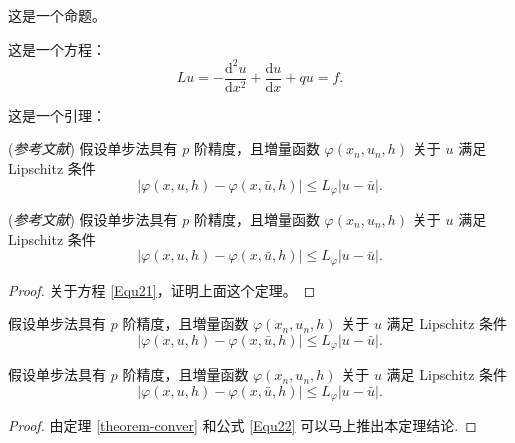 \documentclass{shnuthesis}
\begin{document}
\begin{proposition}[Proposition]
这是一个命题。
\end{proposition}

这是一个方程：
\begin{equation}\label{Equ21}
L u=-\frac{\mathrm{d}^{2} u}{\mathrm{d} x^{2}}+\frac{\mathrm{d} u}{\mathrm{d} x}+q u=f.
\end{equation}

这是一个引理：
\begin{lemma}\label{lemma-conver} {\rm (\textit{参考文献}\cite{Shen1994})}
假设单步法具有 $p$ 阶精度，且増量函数 $\varphi(x_{n}, u_{n}, h)$ 关于 $u$ 满足 Lipschitz 条件
\begin{equation}\label{Equ22}
|\varphi(x, u, h)-\varphi(x, \bar{u}, h)| \leqslant L_{\varphi}|u-\bar{u}|.
\end{equation}
\end{lemma}

\begin{theorem}\label{theorem-conver} {\rm (\textit{参考文献}\cite{Adams1975})}
假设单步法具有 $p$ 阶精度，且増量函数 $\varphi(x_{n}, u_{n}, h)$ 关于 $u$ 满足 Lipschitz 条件
\begin{equation}\label{Equ23}
|\varphi(x, u, h)-\varphi(x, \bar{u}, h)| \leqslant L_{\varphi}|u-\bar{u}|.
\end{equation}
\end{theorem}
\begin{proof}
关于方程 \eqref{Equ21}，证明上面这个定理。
\end{proof}


\begin{theorem}\label{theorem-conver2}
假设单步法具有 $p$ 阶精度，且増量函数 $\varphi(x_{n}, u_{n}, h)$ 关于 $u$ 满足 Lipschitz 条件
\begin{equation}\label{Equ24}
|\varphi(x, u, h)-\varphi(x, \bar{u}, h)| \leqslant L_{\varphi}|u-\bar{u}|.
\end{equation}
\end{theorem}

\begin{corollary}\label{col-conver}
假设单步法具有 $p$ 阶精度，且増量函数 $\varphi(x_{n}, u_{n}, h)$ 关于 $u$ 满足 Lipschitz 条件
\begin{equation}\label{Equ25}
|\varphi(x, u, h)-\varphi(x, \bar{u}, h)| \leqslant L_{\varphi}|u-\bar{u}|.
\end{equation}
\end{corollary}
\begin{proof}
 由定理 \ref{theorem-conver} 和公式 \ref{Equ22} 可以马上推出本定理结论.
\end{proof}
\end{document}
